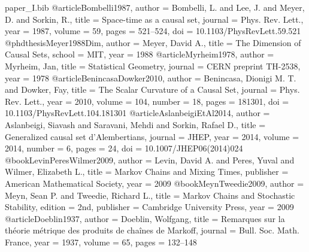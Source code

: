 
\begin{filecontents*}{paper_I.bib}
@article{Bombelli1987,
  author  = {Bombelli, L. and Lee, J. and Meyer, D. and Sorkin, R.},
  title   = {Space-time as a causal set},
  journal = {Phys. Rev. Lett.},
  year    = {1987},
  volume  = {59},
  pages   = {521--524},
  doi     = {10.1103/PhysRevLett.59.521}
}
@phdthesis{Meyer1988Dim,
  author  = {Meyer, David A.},
  title   = {The Dimension of Causal Sets},
  school  = {MIT},
  year    = {1988}
}
@article{Myrheim1978,
  author  = {Myrheim, Jan},
  title   = {Statistical Geometry},
  journal = {CERN preprint TH-2538},
  year    = {1978}
}
@article{BenincasaDowker2010,
  author  = {Benincasa, Dionigi M. T. and Dowker, Fay},
  title   = {The Scalar Curvature of a Causal Set},
  journal = {Phys. Rev. Lett.},
  year    = {2010},
  volume  = {104},
  number  = {18},
  pages   = {181301},
  doi     = {10.1103/PhysRevLett.104.181301}
}
@article{AslanbeigiEtAl2014,
  author  = {Aslanbeigi, Siavash and Saravani, Mehdi and Sorkin, Rafael D.},
  title   = {Generalized causal set d'Alembertians},
  journal = {JHEP},
  year    = {2014},
  volume  = {2014},
  number  = {6},
  pages   = {24},
  doi     = {10.1007/JHEP06(2014)024}
}
@book{LevinPeresWilmer2009,
  author  = {Levin, David A. and Peres, Yuval and Wilmer, Elizabeth L.},
  title   = {Markov Chains and Mixing Times},
  publisher = {American Mathematical Society},
  year    = {2009}
}
@book{MeynTweedie2009,
  author  = {Meyn, Sean P. and Tweedie, Richard L.},
  title   = {Markov Chains and Stochastic Stability},
  edition = {2nd},
  publisher = {Cambridge University Press},
  year    = {2009}
}
@article{Doeblin1937,
  author  = {Doeblin, Wolfgang},
  title   = {Remarques sur la th\'eorie m\'etrique des produits de cha\^ines de Markoff},
  journal = {Bull. Soc. Math. France},
  year    = {1937},
  volume  = {65},
  pages   = {132--148}
}
\end{filecontents*}

\documentclass[11pt]{article}

\usepackage[margin=1in]{geometry}
\usepackage{amsmath,amssymb,amsthm,mathtools}
\usepackage{graphicx}
\usepackage{hyperref}
\usepackage{microtype}
\usepackage[numbers,sort&compress]{natbib}
\usepackage{xcolor}
\usepackage{float}
\usepackage[section]{placeins}
\usepackage{bm}

\hypersetup{
  colorlinks=true,
  linkcolor=blue!50!black,
  citecolor=blue!50!black,
  urlcolor=blue!50!black
}


